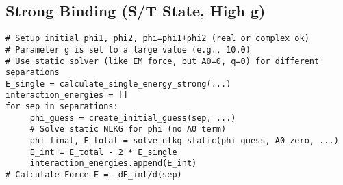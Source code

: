 \documentclass[11pt]{article}
\begin{document}
\subsection{Strong Binding (S/T State, High g)}
\begin{lstlisting}[caption=Strong Force Logic, label=lst:st_code]
# Setup initial phi1, phi2, phi=phi1+phi2 (real or complex ok)
# Parameter g is set to a large value (e.g., 10.0)
# Use static solver (like EM force, but A0=0, q=0) for different separations
E_single = calculate_single_energy_strong(...) 
interaction_energies = []
for sep in separations:
     phi_guess = create_initial_guess(sep, ...)
     # Solve static NLKG for phi (no A0 term)
     phi_final, E_total = solve_nlkg_static(phi_guess, A0_zero, ...) 
     E_int = E_total - 2 * E_single
     interaction_energies.append(E_int)
# Calculate Force F = -dE_int/d(sep)
\end{lstlisting}
\end{document}
